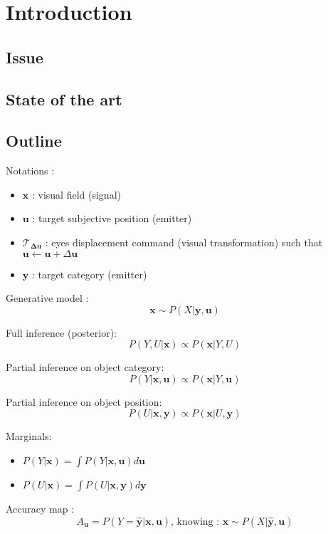 \section{Introduction}

\subsection{Issue}

\subsection{State of the art}

\subsection{Outline}

Notations :
\begin{itemize}
	\item $\boldsymbol{x}$ : visual field (signal)
	\item $\boldsymbol{u}$ : target subjective position (emitter)
	\item $\mathcal{T}_{\boldsymbol{\Delta u}}$ : eyes displacement command (visual transformation)	such that $\boldsymbol{u} \leftarrow \boldsymbol{u} + \Delta \boldsymbol{u}$
	\item $\boldsymbol{y}$ : target category (emitter)
\end{itemize}

Generative model :
$$ \boldsymbol{x} \sim P(X|\boldsymbol{y}, \boldsymbol{u}) $$

Full inference (posterior):
$$ P(Y, U|\boldsymbol{x}) \propto  P(\boldsymbol{x}|Y, U) $$

Partial inference on object category:
$$ P(Y|\boldsymbol{x}, \boldsymbol{u}) \propto  P(\boldsymbol{x}|Y, \boldsymbol{u}) $$

Partial inference on object position:
$$ P(U|\boldsymbol{x}, \boldsymbol{y}) \propto  P(\boldsymbol{x}|U, \boldsymbol{y}) $$

Marginals:
\begin{itemize}
\item $ P(Y|\boldsymbol{x}) = \int P(Y|\boldsymbol{x}, \boldsymbol{u}) d\boldsymbol{u}$
\item $ P(U|\boldsymbol{x}) = \int P(U|\boldsymbol{x}, \boldsymbol{y}) d\boldsymbol{y}$
\end{itemize}

Accuracy map : 
$$A_{\boldsymbol{u}} = P(Y = \hat{\boldsymbol{y}}|\boldsymbol{x}, \boldsymbol{u})
\text{,  knowing  : }
 \boldsymbol{x} \sim P(X|\hat{\boldsymbol{y}}, \boldsymbol{u}) $$
 
